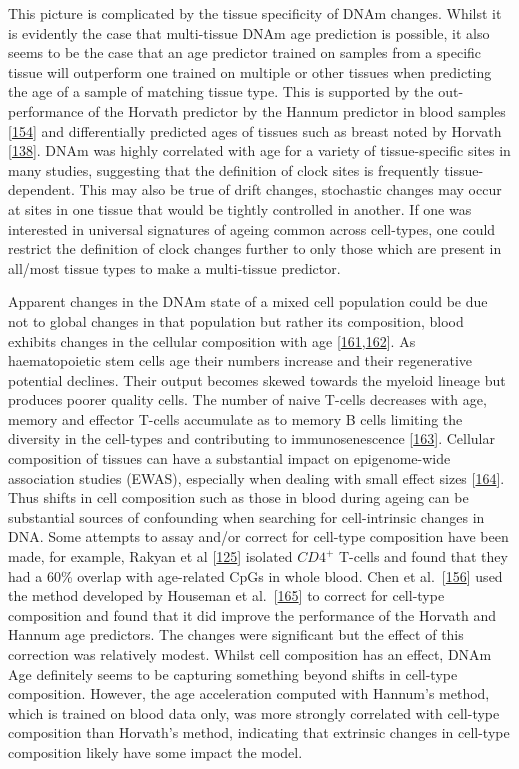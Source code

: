 \documentclass[
]{book}
\begin{document}
This picture is complicated by the tissue specificity of DNAm changes.
Whilst it is evidently the case that multi-tissue DNAm age prediction is possible, it also seems to be the case that an age predictor trained on samples from a specific tissue will outperform one trained on multiple or other tissues when predicting the age of a sample of matching tissue type.
This is supported by the out-performance of the Horvath predictor by the Hannum predictor in blood samples {[}\protect\hyperlink{ref-Marioni2015}{154}{]} and differentially predicted ages of tissues such as breast noted by Horvath {[}\protect\hyperlink{ref-Horvath2013}{138}{]}.
DNAm was highly correlated with age for a variety of tissue-specific sites in many studies, suggesting that the definition of clock sites is frequently tissue-dependent.
This may also be true of drift changes, stochastic changes may occur at sites in one tissue that would be tightly controlled in another.
If one was interested in universal signatures of ageing common across cell-types, one could restrict the definition of clock changes further to only those which are present in all/most tissue types to make a multi-tissue predictor.

Apparent changes in the DNAm state of a mixed cell population could be due not to global changes in that population but rather its composition, blood exhibits changes in the cellular composition with age {[}\protect\hyperlink{ref-Rimmele2014}{161},\protect\hyperlink{ref-Izzo2020}{162}{]}.
As haematopoietic stem cells age their numbers increase and their regenerative potential declines.
Their output becomes skewed towards the myeloid lineage but produces poorer quality cells.
The number of naive T-cells decreases with age, memory and effector T-cells accumulate as to memory B cells limiting the diversity in the cell-types and contributing to immunosenescence {[}\protect\hyperlink{ref-Geiger2013}{163}{]}.
Cellular composition of tissues can have a substantial impact on epigenome-wide association studies (EWAS), especially when dealing with small effect sizes {[}\protect\hyperlink{ref-Jaffe2014}{164}{]}.
Thus shifts in cell composition such as those in blood during ageing can be substantial sources of confounding when searching for cell-intrinsic changes in DNA.
Some attempts to assay and/or correct for cell-type composition have been made, for example, Rakyan et al {[}\protect\hyperlink{ref-Rakyan2010}{125}{]} isolated \(CD4^+\) T-cells and found that they had a 60\% overlap with age-related CpGs in whole blood. Chen et al.~{[}\protect\hyperlink{ref-Chen2016a}{156}{]} used the method developed by Houseman et al.~{[}\protect\hyperlink{ref-Houseman2012}{165}{]} to correct for cell-type composition and found that it did improve the performance of the Horvath and Hannum age predictors.
The changes were significant but the effect of this correction was relatively modest.
Whilst cell composition has an effect, DNAm Age definitely seems to be capturing something beyond shifts in cell-type composition.
However, the age acceleration computed with Hannum's method, which is trained on blood data only, was more strongly correlated with cell-type composition than Horvath's method, indicating that extrinsic changes in cell-type composition likely have some impact the model.
\end{document}
